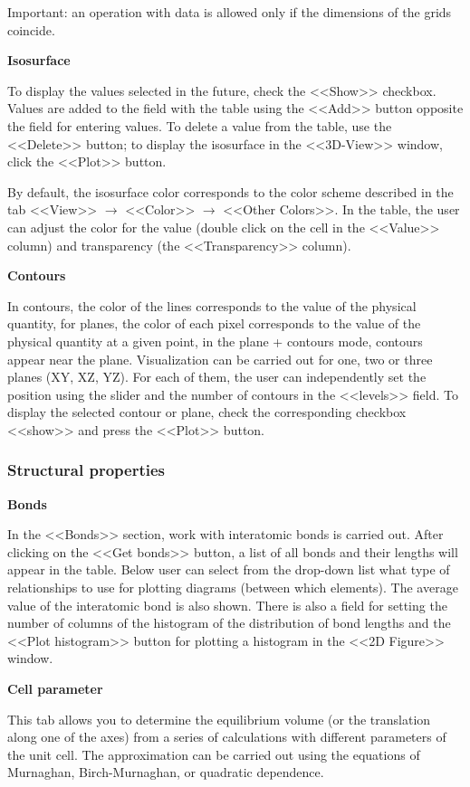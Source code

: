 \documentclass{article}
\begin{document}
Important: an operation with data is allowed only if the dimensions of the grids coincide.


\textbf{Isosurface}

To display the values selected in the future, check the <<Show>> checkbox. Values are added to the field with the table using the <<Add>> button opposite the field for entering values. To delete a value from the table, use the <<Delete>> button; to display the isosurface in the <<3D-View>> window, click the <<Plot>> button.

By default, the isosurface color corresponds to the color scheme described in the tab <<View>> $\rightarrow$ <<Color>> $\rightarrow$ <<Other Colors>>. In the table, the user can adjust the color for the value (double click on the cell in the <<Value>> column) and transparency (the <<Transparency>> column). 

\textbf{Contours}

In contours, the color of the lines corresponds to the value of the physical quantity, for planes, the color of each pixel corresponds to the value of the physical quantity at a given point, in the plane + contours mode, contours appear near the plane. Visualization can be carried out for one, two or three planes (XY, XZ, YZ). For each of them, the user can independently set the position using the slider and the number of contours in the <<levels>> field. To display the selected contour or plane, check the corresponding checkbox <<show>> and press the <<Plot>> button.

\subsubsection{Structural properties}

\textbf{Bonds}

In the <<Bonds>> section, work with interatomic bonds is carried out. After clicking on the <<Get bonds>> button, a list of all bonds and their lengths will appear in the table. Below user can select from the drop-down list what type of relationships to use for plotting diagrams (between which elements). The average value of the interatomic bond is also shown. There is also a field for setting the number of columns of the histogram of the distribution of bond lengths and the <<Plot histogram>> button for plotting a histogram in the <<2D Figure>> window.

\textbf{Cell parameter}

This tab allows you to determine the equilibrium volume (or the translation along one of the axes) from a series of calculations with different parameters of the unit cell. The approximation can be carried out using the equations of Murnaghan, Birch-Murnaghan, or quadratic dependence.
\end{document}
